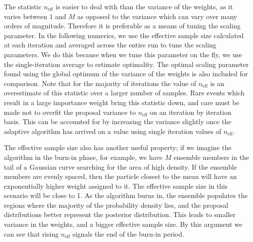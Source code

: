 \documentclass[final]{siamltex}
\newcommand{\neff}{n_{\text{eff}}}
\begin{document}
The statistic $\neff$ is easier to deal with than the variance of the
weights, as it varies between $1$ and $M$ as opposed to the variance
which can vary over many orders of magnitude.
Therefore it is preferable as a means of tuning the scaling
parameter. In the following numerics, we use the effective sample size
calculated at each iteration and averaged across the entire run to
tune the scaling parameters. We do this because when we tune this
parameter on the fly, we use the single-iteration average to estimate
optimality. The optimal scaling parameter found using the global
optimum of the variance of the weights is also included for
comparison. Note that for the majority of iterations the value of
$\neff$ is an overestimate of this statistic over a larger number of
samples. Rare events which result in a large importance weight bring
this statistic down, and care must be made not to overfit the proposal
variance to $\neff$ on an iteration by iteration basis. This can be
accounted for by increasing the variance slightly once the adaptive
algorithm has arrived on a value using single iteration values of $\neff$.

The effective sample size also has another useful property; if we
imagine the algorithm in the burn-in phase, for example, we have $M$
ensemble members in the tail of a Gaussian curve searching for the area of
high density. If the ensemble members are evenly spaced, then the particle
closest to the mean will have an exponentially higher weight assigned
to it. The effective sample size in this scenario will be close to
1. As the algorithm burns in, the ensemble populates the regions where
the majority of the probability density lies, and the proposal
distributions better represent the posterior distribution. This leads
to smaller variance in the weights, and a bigger effective sample size.
By this argument we can see that rising $\neff$ signals the end of the burn-in period.
\end{document}
